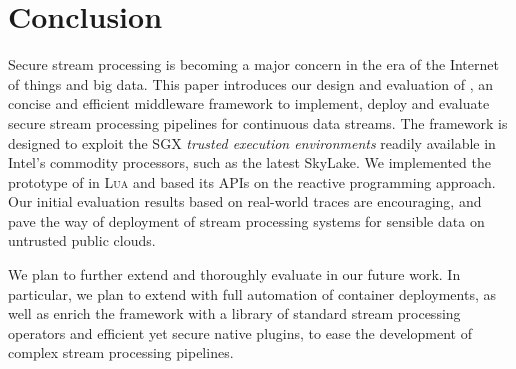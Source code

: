 \section{Conclusion}
\label{sec:conclusion}

Secure stream processing is becoming a major concern in the era of the Internet of things and big data.
This paper introduces our design and evaluation of \SYS{}, an concise and efficient middleware framework to implement, deploy and evaluate secure stream processing pipelines for continuous data streams.
The framework is designed to exploit the SGX \emph{trusted execution environments} readily available in Intel's commodity processors, such as the latest SkyLake.
We implemented the prototype of \SYS{} in \textsc{Lua} and based its APIs on the reactive programming approach.
Our initial evaluation results based on real-world traces are encouraging, and pave the way of deployment of stream processing systems for sensible data on untrusted public clouds.

We plan to further extend and thoroughly evaluate \SYS in our future work.
In particular, we plan to extend \SYS with full automation of container deployments, as well as enrich the framework with a library of standard stream processing operators and efficient yet secure native plugins, to ease the development of complex stream processing pipelines.
